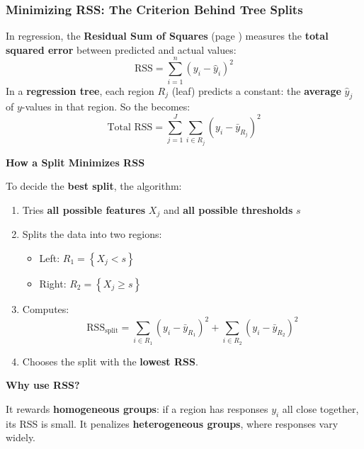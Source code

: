 \subsubsection{Minimizing RSS: The Criterion Behind Tree Splits}

In regression, the \textbf{Residual Sum of Squares} (page \pageref{eq: RSS}) measures the \textbf{total squared error} between predicted and actual values:
\begin{equation*}
    \text{RSS} = \sum_{i=1}^n (y_i - \hat{y}_i)^2    
\end{equation*}
In a \textbf{regression tree}, each region $R_j$ (leaf) predicts a constant: the \textbf{average} $\hat{y}_j$ of $y$-values in that region. So the  becomes:
\begin{equation}
    \text{Total RSS} = \sum_{j=1}^J \sum_{i \in R_j} \left(y_i - \bar{y}_{R_j}\right)^2    
\end{equation}

\highspace
\begin{flushleft}
    \textcolor{Green3}{ \textbf{How a Split Minimizes RSS}}
\end{flushleft}
To decide the \textbf{best split}, the algorithm:
\begin{enumerate}
    \item Tries \textbf{all possible features} $X_j$ and \textbf{all possible thresholds} $s$
    \item Splits the data into two regions:
    \begin{itemize}
        \item Left: $R_1 = \left\{ X_j < s \right\}$
        \item Right: $R_2 = \left\{ X_j \geq s \right\}$
    \end{itemize}
    \item Computes:
    \begin{equation*}
        \text{RSS}_{\text{split}} = \sum_{i \in R_1} \left(y_i - \bar{y}_{R_1}\right)^2 + \sum_{i \in R_2} \left(y_i - \bar{y}_{R_2}\right)^2
    \end{equation*}
    \item Chooses the split with the \textbf{lowest RSS}.
\end{enumerate}

\highspace
\begin{flushleft}
    \textcolor{Green3}{ \textbf{Why use RSS?}}
\end{flushleft}
It rewards \textbf{homogeneous groups}: if a region has responses $y_i$ all close together, its RSS is small. It penalizes \textbf{heterogeneous groups}, where responses vary widely.